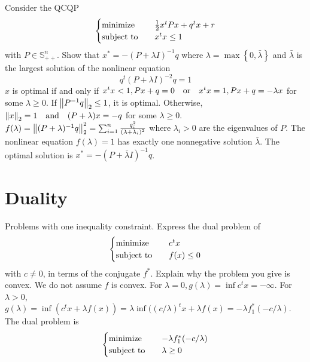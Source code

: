 \begin{problem}[4.22]
    Consider the QCQP\[\begin{cases}
        \operatorname{minimize} \quad &\frac{1}{2} x^tPx + q^tx + r\\
        \operatorname{subject\ to} \quad &x^tx \le 1
    \end{cases}\]
    with $P \in \mathbb{S}_{++}^n$. Show that $x^* = -(P + \lambda I)^{-1}q$ where $\lambda = \max\left\{0, \bar{\lambda}\right\}$ and $\bar{\lambda}$ is the largest solution of the nonlinear equation \[q^t(P + \lambda I)^{-2}q = 1\]
    \Answer $x$ is optimal if and only if $x^tx < 1, Px + q = 0 \qor x^tx = 1, Px + q = -\lambda x$ for some $\lambda \ge 0$. If $\norm{P^{-1}q}_2 \le 1$, it is optimal. Otherwise, $\norm{x}_2 = 1 \qand (P + \lambda)x = -q$ for some $\lambda \ge 0$. $f(\lambda) = \norm{(P + \lambda)^{-1}q}_2^2 = \sum_{i = 1}^n \frac{q_i^2}{(\lambda + \lambda_i)^2}$ where $\lambda_i > 0$ are the eigenvalues of $P$. The nonlinear equation $f(\lambda) = 1$ has exactly one nonnegative solution $\bar{\lambda}$. The optimal solution is $x^* = -(P + \bar{\lambda}I)^{-1}q$.
\end{problem}

\section{Duality}
\begin{problem}[5.3]
    Problems with one inequality constraint. Express the dual problem of\[\begin{cases}
        \operatorname{minimize} \quad &c^tx \\
        \operatorname{subject\ to} \quad &f(x) \le 0
    \end{cases}\] with $c \neq 0$, in terms of the conjugate $f^*$. Explain why the problem you give is convex. We do not assume $f$ is convex.
    \Answer For $\lambda = 0, g(\lambda) = \inf c^tx = -\infty$. For $\lambda > 0$, $g(\lambda) = \inf (c^tx + \lambda f(x)) = \lambda \inf ((c / \lambda)^tx + \lambda f(x) = -\lambda f_1^*(-c/\lambda)$. The dual problem is \[\begin{cases}
        \operatorname{minimize}\quad &-\lambda f_1^*(-c/\lambda)\\
        \operatorname{subject\ to}\quad &\lambda \ge 0
    \end{cases}\]
\end{problem}

